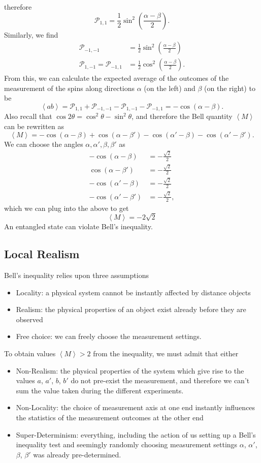 \documentclass{article}
\begin{document}
therefore
\[
    \mathcal{P}_{1,1}=\frac{1}{2}\sin^2 \left( \frac{\alpha -\beta }{2} \right).
\]
Similarly, we find
\begin{align*}
    \mathcal{P}_{-1,-1} &= \frac{1}{2}\sin^2 \left( \frac{\alpha -\beta }{2} \right) \\
    \mathcal{P}_{1,-1}=\mathcal{P}_{-1,1}&=\frac{1}{2}\cos^2 \left( \frac{\alpha -\beta }{2} \right).
\end{align*}
From this, we can calculate the expected average of the outcomes of the measurement of the spins along directions $\alpha $ (on the left) and $\beta $ (on the right) to be
\[
    \left\langle ab \right\rangle =\mathcal{P}_{1,1}+\mathcal{P}_{-1,-1}-\mathcal{P}_{1,-1}-\mathcal{P}_{-1,1}=-\cos(\alpha -\beta ).
\]
Also recall that $\cos 2\theta =\cos^2\theta -\sin^2\theta $, and therefore the Bell quantity $\left\langle M \right\rangle $ can be rewritten as
\[
    \left\langle M \right\rangle =-\cos(\alpha -\beta )+\cos(\alpha -\beta')-\cos(\alpha'-\beta )-\cos(\alpha'-\beta').
\]
We can choose the angles $\alpha ,\alpha',\beta ,\beta'$ as
\begin{align*}
    -\cos(\alpha -\beta ) &= -\frac{\sqrt{2}}{2}\\
    \cos(\alpha -\beta')&=-\frac{\sqrt{2}}{2}\\
    -\cos(\alpha'-\beta )&=-\frac{\sqrt{2}}{2}\\
    -\cos(\alpha'-\beta')&=-\frac{\sqrt{2}}{2},
\end{align*}
which we can plug into the above to get
\[
    \boxed{\left\langle M \right\rangle =-2\sqrt{2}}
\]
An entangled state can violate Bell's inequality.

\subsection{Local Realism}
Bell's inequality relies upon three assumptions
\begin{itemize}
    \item Locality: a physical system cannot be instantly affected by distance objects
    \item Realism: the physical properties of an object exist already before they are observed
    \item Free choice: we can freely choose the measurement settings.
\end{itemize}
To obtain values $\left\langle M \right\rangle >2$ from the inequality, we must admit that either
\begin{itemize}
    \item Non-Realism: the physical properties of the system which give rise to the values $a$, $a'$, $b$, $b'$ do not pre-exist the measurement, and therefore we can't sum the value taken during the different experiments.
    \item Non-Locality: the choice of measurement axis at one end instantly influences the statistics of the measurement outcomes at the other end
    \item Super-Determinism: everything, including the action of us setting up a Bell's inequality test and seemingly randomly choosing measurement settings $\alpha $, $\alpha'$, $\beta $, $\beta'$ was already pre-determined.
\end{itemize}
\end{document}
